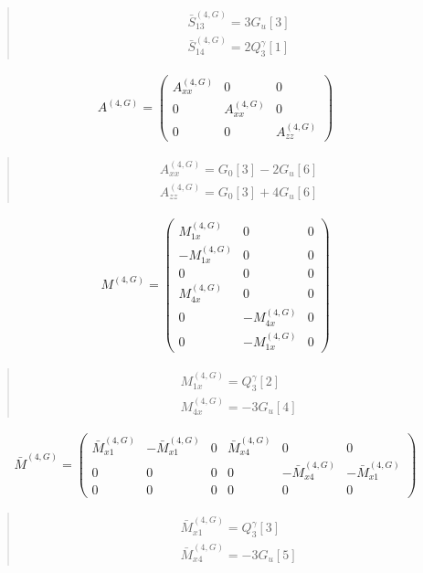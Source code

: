 \documentclass[fleqn,10pt]{jsarticle}
\begin{document}
\begin{quote}
\begin{align*}
& \bar{S}^{(4,G)}_{13} = 3 G_{u}[3] \\
& \bar{S}^{(4,G)}_{14} = 2 Q_{3}^{\gamma}[1]
\end{align*}
\end{quote}
\begin{align*}
A^{(4,G)} = \begin{pmatrix} A^{(4,G)}_{xx} & 0 & 0 \\ 0 & A^{(4,G)}_{xx} & 0 \\ 0 & 0 & A^{(4,G)}_{zz} \end{pmatrix}
\end{align*}
\begin{quote}
\begin{align*}
& A^{(4,G)}_{xx} = G_{0}[3] - 2 G_{u}[6] \\
& A^{(4,G)}_{zz} = G_{0}[3] + 4 G_{u}[6]
\end{align*}
\end{quote}
\begin{align*}
M^{(4,G)} = \begin{pmatrix} M^{(4,G)}_{1x} & 0 & 0 \\ - M^{(4,G)}_{1x} & 0 & 0 \\ 0 & 0 & 0 \\ M^{(4,G)}_{4x} & 0 & 0 \\ 0 & - M^{(4,G)}_{4x} & 0 \\ 0 & - M^{(4,G)}_{1x} & 0 \end{pmatrix}
\end{align*}
\begin{quote}
\begin{align*}
& M^{(4,G)}_{1x} = Q_{3}^{\gamma}[2] \\
& M^{(4,G)}_{4x} = - 3 G_{u}[4]
\end{align*}
\end{quote}
\begin{align*}
\bar{M}^{(4,G)} = \begin{pmatrix} \bar{M}^{(4,G)}_{x1} & - \bar{M}^{(4,G)}_{x1} & 0 & \bar{M}^{(4,G)}_{x4} & 0 & 0 \\ 0 & 0 & 0 & 0 & - \bar{M}^{(4,G)}_{x4} & - \bar{M}^{(4,G)}_{x1} \\ 0 & 0 & 0 & 0 & 0 & 0 \end{pmatrix}
\end{align*}
\begin{quote}
\begin{align*}
& \bar{M}^{(4,G)}_{x1} = Q_{3}^{\gamma}[3] \\
& \bar{M}^{(4,G)}_{x4} = - 3 G_{u}[5]
\end{align*}
\end{quote}
\end{document}
